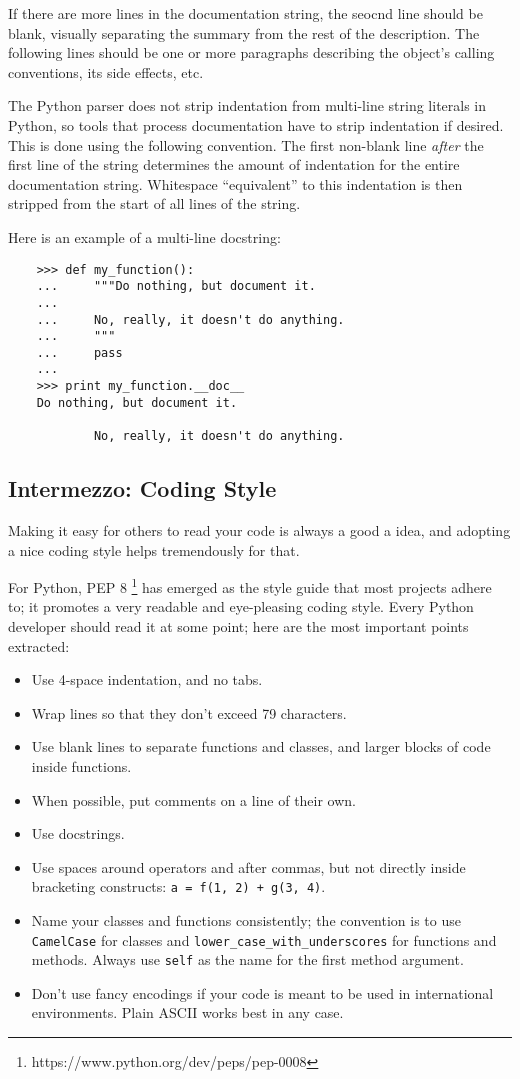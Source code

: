 \documentclass[UTF8]{article}
\begin{document}
If there are more lines in the documentation string, the seocnd line should be blank, visually
separating the summary from the rest of the description. The following lines should be one or more
paragraphs describing the object's calling conventions, its side effects, etc.

The Python parser does not strip indentation from multi-line string literals in Python, so tools
that process documentation have to strip indentation if desired. This is done using the following
convention. The first non-blank line \emph{after} the first line of the string determines the
amount of indentation for the entire documentation string. Whitespace ``equivalent'' to this
indentation is then stripped from the start of all lines of the string.

Here is an example of a multi-line docstring:
\begin{verbatim}
    >>> def my_function():
    ...     """Do nothing, but document it.
    ...
    ...     No, really, it doesn't do anything.
    ...     """
    ...     pass
    ...
    >>> print my_function.__doc__
    Do nothing, but document it.

            No, really, it doesn't do anything.

\end{verbatim}

\subsection{Intermezzo: Coding Style}
Making it easy for others to read your code is always a good a idea, and adopting a nice coding
style helps tremendously for that.

For Python, PEP 8 \footnote{https://www.python.org/dev/peps/pep-0008} has emerged as the style
guide that most projects adhere to; it promotes a very readable and eye-pleasing coding style.
Every Python developer should read it at some point; here are the most important points extracted:
\begin{itemize}
    \item Use 4-space indentation, and no tabs.
    \item Wrap lines so that they don't exceed 79 characters.
    \item Use blank lines to separate functions and classes, and larger blocks of code inside
    functions.
    \item When possible, put comments on a line of their own.
    \item Use docstrings.
    \item Use spaces around operators and after commas, but not directly inside bracketing
    constructs: \texttt{a = f(1, 2) + g(3, 4)}.
    \item Name your classes and functions consistently; the convention is to use \texttt{CamelCase}
    for classes and \texttt{lower\_case\_with\_underscores} for functions and methods. Always use
    \texttt{self} as the name for the first method argument.
    \item Don't use fancy encodings if your code is meant to be used in international environments.
    Plain ASCII works best in any case.
\end{itemize}
\end{document}
